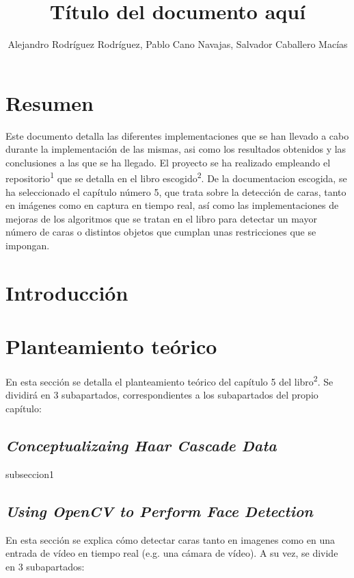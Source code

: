 \documentclass[a4paper]{article}
\title{Título del documento aquí}
\author{Alejandro Rodríguez Rodríguez, Pablo Cano Navajas, Salvador Caballero Macías}
\begin{document}
\maketitle

\newpage
\tableofcontents

\newpage
\section{Resumen}

Este documento detalla las diferentes implementaciones que se han llevado a cabo durante la implementación de las mismas, asi como los resultados obtenidos y las conclusiones a las que se ha llegado. El proyecto se ha realizado empleando el repositorio\textsuperscript{1} que se detalla en el libro escogido\textsuperscript{2}.
De la documentacion escogida, se ha seleccionado el capítulo número 5, que trata sobre la detección de caras, tanto en imágenes como en captura en tiempo real, así como las implementaciones de mejoras de los algoritmos que se tratan en el libro para detectar un mayor número de caras o distintos objetos que cumplan unas restricciones que se impongan.

\section{Introducción}

\section{Planteamiento teórico}

En esta sección se detalla el planteamiento teórico del capítulo 5 del libro\textsuperscript{2}. Se dividirá en 3 subapartados, correspondientes a los subapartados del propio capítulo:

\subsection{\textit{Conceptualizaing Haar Cascade Data}}

subseccion1

\subsection{\textit{Using OpenCV to Perform Face Detection}}

En esta sección se explica cómo detectar caras tanto en imagenes como en una entrada de vídeo en tiempo real (e.g. una cámara de vídeo). A su vez, se divide en 3 subapartados:
\end{document}
